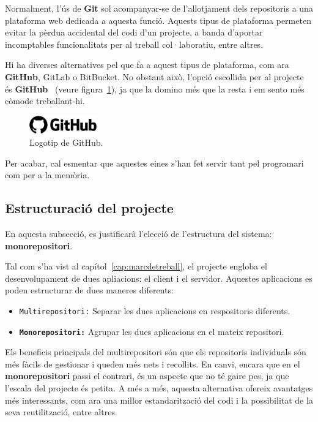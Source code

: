 \documentclass[a4paper,12pt]{ThesisStyle}
\begin{document}
Normalment, l'ús de \textbf{Git} sol acompanyar-se de l'allotjament dels repositoris a una plataforma web dedicada a aquesta funció. Aquests tipus de plataforma permeten evitar la pèrdua accidental del codi d'un projecte, a banda d'aportar incomptables funcionalitats per al treball col·laboratiu, entre altres.

Hi ha diverses alternatives pel que fa a aquest tipus de plataforma, com ara \textbf{GitHub}, GitLab o BitBucket. No obstant això, l'opció escollida per al projecte és \textbf{GitHub}~\cite{GitHub} (veure figura~\ref{img:logo_github}), ja que la domino més que la resta i em sento més còmode treballant-hi.

\begin{figure}[H]
  \centering
  \includegraphics[width=0.26\textwidth]{assets/logos/GitHub.png}
  \caption{\label{img:logo_github}Logotip de GitHub.}
\end{figure}

Per acabar, cal esmentar que aquestes eines s'han fet servir tant pel programari com per a la memòria.

\subsection{Estructuració del projecte}
\label{subsec:decisions_estructura_estructura}

En aquesta subsecció, es justificarà l'elecció de l'estructura del sistema: \textbf{monorepositori}.

Tal com s'ha vist al capítol~\ref{cap:marcdetreball}, el projecte engloba el desenvolupament de dues apliacions: el client i el servidor. Aquestes aplicacions es poden estructurar de dues maneres diferents:
\begin{itemize}
  \item \texttt{Multirepositori:} Separar les dues aplicacions en respositoris diferents. 
  \item \texttt{\textbf{Monorepositori:}} Agrupar les dues aplicacions en el mateix repositori.
\end{itemize}

Els beneficis principals del multirepositori són que els repositoris individuals són més fàcils de gestionar i queden més nets i recollits. En canvi, encara que en el \textbf{monorepositori} passi el contrari, és un aspecte que no té gaire pes, ja que l'escala del projecte és petita. A més a més, aquesta alternativa ofereix avantatges més interessants, com ara una millor estandarització del codi i la possibilitat de la seva reutilització, entre altres.
\end{document}
